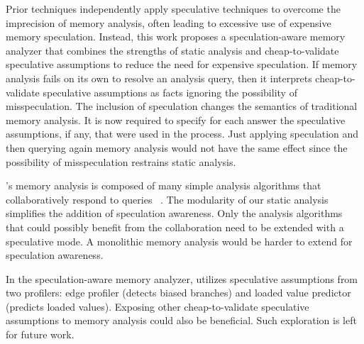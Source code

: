 %
Prior techniques independently apply speculative techniques to
overcome the imprecision of memory analysis, often leading to
excessive use of expensive memory speculation.
%
%
%
%
Instead, this work proposes a speculation-aware memory analyzer that
combines the strengths of static analysis and cheap-to-validate
speculative assumptions to reduce the need for expensive speculation.
If memory analysis fails on its own to resolve an analysis query, then
it interprets cheap-to-validate speculative assumptions as facts
ignoring the possibility of misspeculation.
%
The inclusion of speculation changes the semantics of traditional
memory analysis. It is now required to specify for each answer the
speculative assumptions, if any, that were used in the process.
%
Just applying speculation and then querying again memory analysis
would not have the same effect since the possibility of misspeculation
restrains static analysis.

%
%

\name's memory analysis is composed of many simple analysis algorithms
that collaboratively respond to queries ~\cite{johnson:14:pldi}.
%
The modularity of our static analysis simplifies the addition of
speculation awareness. Only the analysis algorithms that could
possibly benefit from the collaboration need to be extended with a
speculative mode.
%
A monolithic memory analysis would be harder to extend for speculation
awareness.

In the speculation-aware memory analyzer, \name utilizes speculative
assumptions from two profilers: edge profiler (detects biased
branches) and loaded value predictor (predicts loaded values).
%
Exposing other cheap-to-validate speculative assumptions to memory
analysis could also be beneficial.  Such exploration is left for
future work.

